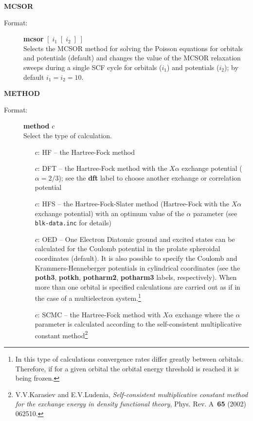 \documentclass[12pt,a4paper]{article}
\newcommand{\ft}[1]{\texttt{#1}}
\newcommand{\fb}[1]{\textbf{#1}}
\begin{document}
\begin{description}
\begin{description}
\begin{description}
\end{description}
\end{description}


\item \textbf{MCSOR} 
\begin{description} 
\item[Format:] \textbf{mcsor} $[\;i_1\;[\;i_2\;]\;]$\\
Selects the MCSOR method for solving the Poisson equations for orbitals and potentials
(default) and changes the value of the MCSOR relaxation sweeps during a single SCF
cycle for orbitals ($i_1$) and potentials ($i_2$); by default $i_1=i_2=10$.

\end{description} 
\item \textbf{METHOD} 
\begin{description} 
\item[Format:] \textbf{method} $c$\\
Select the type of calculation.
\begin{itemize} 
\item[$c$:] HF -- the Hartree-Fock method
\item[$c$:] DFT -- the Hartree-Fock method with the $X\alpha$ exchange
  potential ($\alpha=2/3$); see the \fb{dft} label to choose
  another exchange or correlation potential

\item[$c$:] HFS -- the Hartree-Fock-Slater method (Hartree-Fock with the
  $X\alpha$ exchange potential) with an optimum value of the $\alpha$
  parameter (see \ft{blk-\-data.\-inc} for details)

\item[$c$:] OED -- One Electron Diatomic ground and excited states
  can be calculated for the Coulomb potential in the prolate
  spheroidal coordinates (default). It is also possible to specify 
the Coulomb and Kram\-mers-Henneberger potentials in cylindrical
coordinates (see the \fb{poth3}, \fb{potkh}, \fb{potharm2}, \fb{potharm3}  labels,
respectively). When more than one orbital is specified calculations
are carried out as if in the case of a multielectron
system.\footnote{In this type of calculations convergence rates differ
  greatly between orbitals. Therefore, if for a given orbital the
  orbital energy threshold is reached it is being frozen.} 

\item[$c$:] SCMC -- the Hartree-Fock method with $X\alpha$ exchange where the $\alpha$
  parameter is calculated according to the self-consistent multiplicative constant
  method\footnote{V.V.Karasiev and E.V.Ludenia, \textsl{Self-consistent multiplicative
      constant method for the exchange energy in density functional theory},
    Phys. Rev. A~\textbf{65} (2002) 062510.}


\end{itemize}
\end{description}
\end{description}
\end{document}
